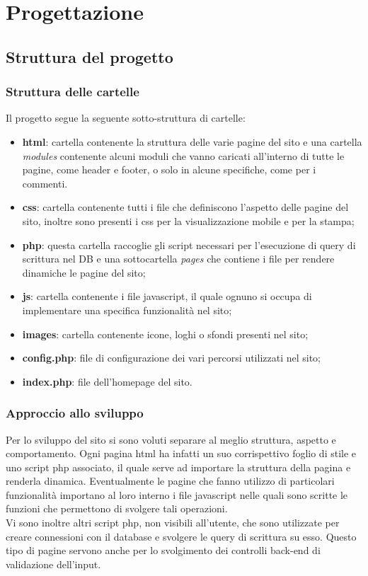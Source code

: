 \section{Progettazione}
\label{sec:progettazione}
\subsection{Struttura del progetto}
\subsubsection{Struttura delle cartelle}
Il progetto segue la seguente sotto-struttura di cartelle:
\begin{itemize}
	\item \textbf{html}: cartella contenente la struttura delle varie pagine del sito e una cartella \textit{modules} contenente alcuni moduli che vanno caricati all'interno di tutte le pagine, come header e footer, o solo in alcune specifiche, come per i commenti.
	\item \textbf{css}: cartella contenente tutti i file che definiscono l'aspetto delle pagine del sito, inoltre sono presenti i css per la visualizzazione mobile e per la stampa;
	\item \textbf{php}: questa cartella raccoglie gli script necessari per l'esecuzione di query di scrittura nel DB e una sottocartella \textit{pages} che contiene i file per rendere dinamiche le pagine del sito;
	\item \textbf{js}: cartella contenente i file javascript, il quale ognuno si occupa di implementare una specifica funzionalità nel sito;
	\item \textbf{images}: cartella contenente icone, loghi o sfondi presenti nel sito; 
	\item \textbf{config.php}: file di configurazione dei vari percorsi utilizzati nel sito;
	\item \textbf{index.php}: file dell'homepage del sito.
\end{itemize}
\subsubsection{Approccio allo sviluppo}
Per lo sviluppo del sito si sono voluti separare al meglio struttura, aspetto e comportamento. Ogni pagina html ha infatti un suo corrispettivo foglio di stile e uno script php associato, il quale serve ad importare la struttura della pagina e renderla dinamica. Eventualmente le pagine che fanno utilizzo di particolari funzionalità importano al loro interno i file javascript nelle quali sono scritte le funzioni che permettono di svolgere tali operazioni.\\
Vi sono inoltre altri script php, non visibili all'utente, che sono utilizzate per creare connessioni con il database e svolgere le query di scrittura su esso. Questo tipo di pagine servono anche per lo svolgimento dei controlli back-end di validazione dell'input.

